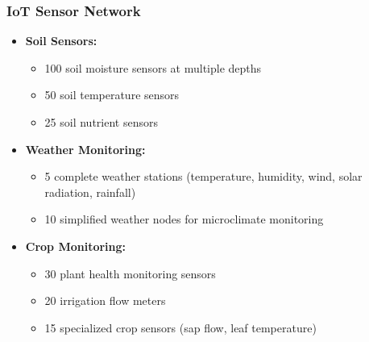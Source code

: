 \subsubsection{IoT Sensor Network}
\begin{itemize}
    \item \textbf{Soil Sensors:}
    \begin{itemize}
        \item 100 soil moisture sensors at multiple depths
        \item 50 soil temperature sensors
        \item 25 soil nutrient sensors
    \end{itemize}
    
    \item \textbf{Weather Monitoring:}
    \begin{itemize}
        \item 5 complete weather stations (temperature, humidity, wind, solar radiation, rainfall)
        \item 10 simplified weather nodes for microclimate monitoring
    \end{itemize}
    
    \item \textbf{Crop Monitoring:}
    \begin{itemize}
        \item 30 plant health monitoring sensors
        \item 20 irrigation flow meters
        \item 15 specialized crop sensors (sap flow, leaf temperature)
    \end{itemize}
\end{itemize}

